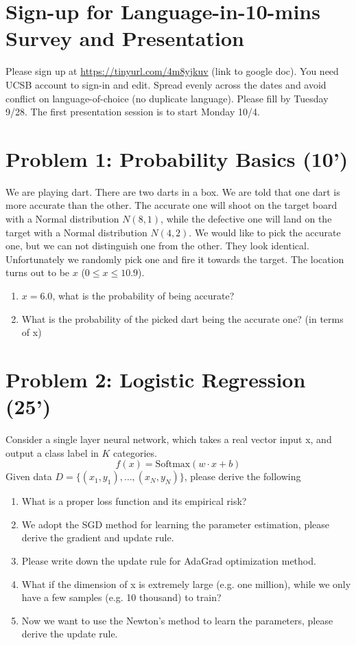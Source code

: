 \documentclass[12pt,letterpaper]{article}
\begin{document}
\section*{Sign-up for Language-in-10-mins Survey and Presentation}
Please sign up at \url{https://tinyurl.com/4m8yjkuv} (link to google doc). You need UCSB account to sign-in and edit.
Spread evenly across the dates and avoid conflict on language-of-choice (no duplicate language). 
Please fill by Tuesday 9/28. The first presentation session is to start Monday 10/4.  

\section*{Problem 1: Probability Basics (10')} 

We are playing dart. There are two darts in a box. We are told that one dart is more accurate than the other. 
The accurate one will shoot on the target board with a Normal distribution $N(8, 1)$, while the defective one will land on the target with a Normal distribution $N(4, 2)$.
We would like to pick the accurate one, but we can not distinguish one from the other. They look identical. 
Unfortunately we randomly pick one and fire it towards the target. The location turns out to be $x$ ($0 \leq x \leq 10.9$).



\begin{enumerate}
  \item $x=6.0$, what is the probability of being accurate?

  \item What is the probability of the picked dart being the accurate one? (in terms of x)

\end{enumerate}



\section*{Problem 2: Logistic Regression (25')} 
Consider a single layer neural network, which takes a real vector input x, and output a class label in $K$ categories. 
\[f(x) = \mathrm{Softmax}(w\cdot x + b)
    \]
Given data $D=\{(x_1,y_1), \dots, (x_N, y_N)\}$, please derive the following
\begin{enumerate}
    \item What is a proper loss function and its empirical risk?
    \item We adopt the SGD method for learning the parameter estimation, please derive the gradient and update rule.
    \item Please write down the update rule for AdaGrad optimization method.
    \item What if the dimension of x is extremely large (e.g. one million), while we only have a few samples (e.g. 10 thousand) to train?
    \item Now we want to use the Newton's method to learn the parameters, please derive the update rule.
\end{enumerate}    
\end{document}

